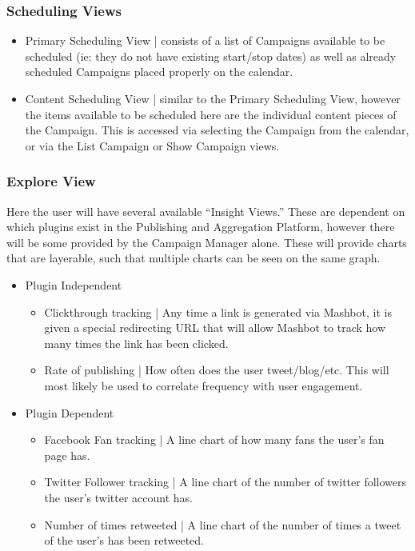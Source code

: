 \documentclass{article}
\begin{document}
\subsubsection{Scheduling Views}
\begin{itemize}
  \item Primary Scheduling View |  consists of a list of Campaigns available to be scheduled (ie: they do not have existing start/stop dates) as well as already scheduled Campaigns placed properly on the calendar.
  \item Content Scheduling View | similar to the Primary Scheduling View, however the items available to be scheduled here are the individual content pieces of the Campaign.  This is accessed via selecting the Campaign from the calendar, or via the List Campaign or Show Campaign views.
\end{itemize}
\subsubsection{Explore View}
 Here the user will have several available ``Insight Views.''  These are dependent on which plugins exist in the Publishing and Aggregation Platform, however there will be some provided by the Campaign Manager alone.  These will provide charts that are layerable, such that multiple charts can be seen on the same graph.
\begin{itemize}
\item Plugin Independent
  \begin{itemize}
  \item Clickthrough tracking | Any time a link is generated via Mashbot, it is given a special redirecting URL that will allow Mashbot to track how many times the link has been clicked.
  \item Rate of publishing | How often does the user tweet/blog/etc. This will most likely be used to correlate frequency with user engagement.
  \end{itemize}
\item Plugin Dependent
  \begin{itemize}
  \item Facebook Fan tracking | A line chart of how many fans the user's fan page has.
  \item Twitter Follower tracking | A line chart of the number of twitter followers the user's twitter account has.
  \item Number of times retweeted | A line chart of the number of times a tweet of the user's has been retweeted.
  \end{itemize}
\end{itemize}
\end{document}
